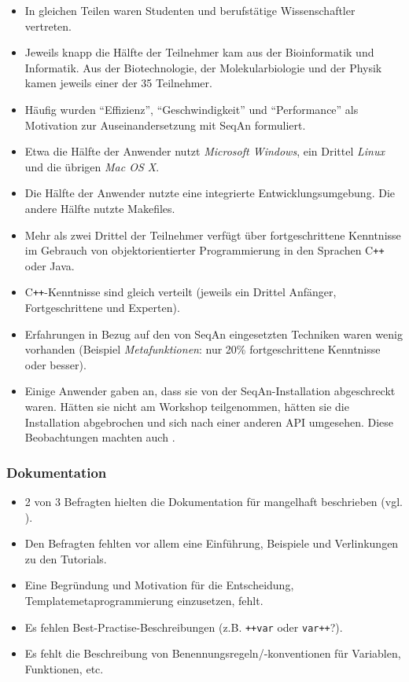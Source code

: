 \begin{itemize}
  \item In gleichen Teilen waren Studenten und berufstätige Wissenschaftler vertreten.
  \item Jeweils knapp die Hälfte der Teilnehmer kam aus der Bioinformatik und Informatik. Aus der Biotechnologie, der Molekularbiologie und der Physik kamen jeweils einer der 35 Teilnehmer.
  \item Häufig wurden ``Effizienz'', ``Geschwindigkeit'' und ``Performance'' als Motivation zur Auseinandersetzung mit SeqAn formuliert.
  \item Etwa die Hälfte der Anwender nutzt \textit{Microsoft Windows}, ein Drittel \textit{Linux} und die übrigen \textit{Mac OS X}.
  \item Die Hälfte der Anwender nutzte eine integrierte Entwicklungsumgebung. Die andere Hälfte nutzte Makefiles.
  \item Mehr als zwei Drittel der Teilnehmer verfügt über fortgeschrittene Kenntnisse im Gebrauch von objektorientierter Programmierung in den Sprachen C{}\verb!++! oder Java.
  \item C{}\verb!++!-Kenntnisse sind gleich verteilt (jeweils ein Drittel Anfänger, Fortgeschrittene und Experten).
  \item Erfahrungen in Bezug auf den von SeqAn eingesetzten Techniken waren wenig vorhanden (Beispiel \textit{Metafunktionen}: nur 20\% fortgeschrittene Kenntnisse oder besser).
  \item Einige Anwender gaben an, dass sie von der SeqAn-Installation abgeschreckt waren. Hätten sie nicht am Workshop teilgenommen, hätten sie die Installation abgebrochen und sich nach einer anderen API umgesehen. Diese Beobachtungen machten auch \cite{sunshine2014searching}.
\end{itemize}



\subsubsection{Dokumentation}

\begin{itemize}
  \item 2 von 3 Befragten hielten die Dokumentation für mangelhaft beschrieben (vgl. ).
  \item Den Befragten fehlten vor allem eine Einführung, Beispiele und Verlinkungen zu den Tutorials.
  \item Eine Begründung und Motivation für die Entscheidung, Templatemetaprogrammierung einzusetzen, fehlt.
  \item Es fehlen Best-Practise-Beschreibungen (z.B. \texttt{++var} oder \texttt{var++}?).
  \item Es fehlt die Beschreibung von Benennungsregeln/-konventionen für Variablen, Funktionen, etc.
\end{itemize}

